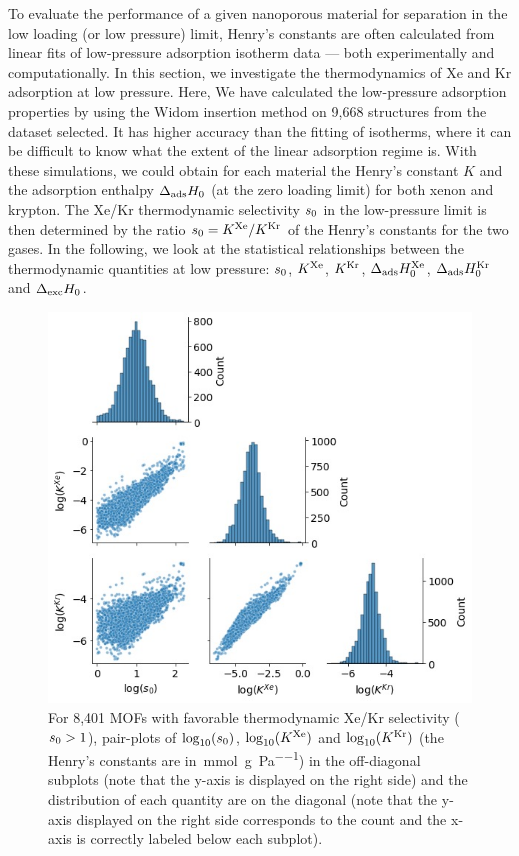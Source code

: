 \documentclass[main.tex]{subfiles}
\begin{document}
To evaluate the performance of a given nanoporous material for separation in the low loading (or low pressure) limit, Henry's constants are often calculated from linear fits of low-pressure adsorption isotherm data --- both experimentally and computationally. In this section, we investigate the thermodynamics of Xe and Kr adsorption at low pressure. Here, We have calculated the low-pressure adsorption properties by using the Widom insertion method\cite{Widom1963, frenkel2001widom} on 9,668 structures from the dataset selected. It has higher accuracy than the fitting of isotherms, where it can be difficult to know what the extent of the linear adsorption regime is. With these simulations, we could obtain for each material the Henry's constant $K$ and the adsorption enthalpy $\Delta_{\text{ads}}H_{\text{0}}$ (at the zero loading limit) for both xenon and krypton. The Xe/Kr thermodynamic selectivity $s_{\text{0}}$ in the low-pressure limit is then determined by the ratio $s_{\text{0}} = K^{\text{Xe}}/K^{\text{Kr}}$ of the Henry's constants for the two gases. In the following, we look at the statistical relationships between the thermodynamic quantities at low pressure: $s_{\text{0}}$, $K^{\text{Xe}}$, $K^{\text{Kr}}$, $\Delta_{\text{ads}}H_{\text{0}}^{\text{Xe}}$, $\Delta_{\text{ads}}H_{\text{0}}^{\text{Kr}}$ and $\Delta_{\text{exc}}H_{\text{0}}$.


\begin{figure}[t]
\centering
  \includegraphics[width=0.6\linewidth]{figures/2-thermo/Henry_0.jpg}
  \caption{For 8,401 MOFs with favorable thermodynamic Xe/Kr selectivity ($s_{\text{0}} > 1$), pair-plots of $\log_{\text{10}}(s_{\text{0}})$, $\log_{\text{10}}(K^{\text{Xe}})$ and $\log_{\text{10}}(K^{\text{Kr}})$ (the Henry's constants are in~\si{\milli\mol\per\gram\per\pascal}) in the off-diagonal subplots (note that the y-axis is displayed on the right side) and the distribution of each quantity are on the diagonal (note that the y-axis displayed on the right side corresponds to the count and the x-axis is correctly labeled below each subplot).}
  \label{fgr:histo_K}
\end{figure}
\end{document}
